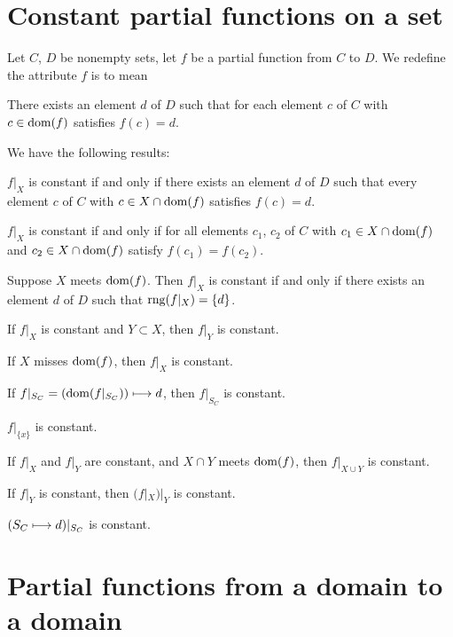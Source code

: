 \documentclass{article}
\begin{document}
\section{Constant partial functions on a set}

\begin{definition}
Let $C$, $D$ be nonempty sets, let $f$ be a partial function from $C$ to
$D$. We redefine the attribute $f$ is  to mean
\begin{defn}
\item There exists an element $d$ of $D$ such that for each element $c$
  of $C$ with $c\in\operatorname{dom}(f)$ satisfies $f(c)=d$.
\end{defn}
\end{definition}

We have the following results:
\begin{thm}
\item\label{partfun2:35} $f|_{X}$ is constant if and only if there
  exists an element $d$ of $D$ such that every element $c$ of $C$ with
  $c\in X\cap\operatorname{dom}(f)$ satisfies $f(c)=d$.
\item\label{partfun2:36} $f|_{X}$ is constant if and only if for all
  elements $c_{1}$, $c_{2}$ of $C$ with $c_{1}\in X\cap\operatorname{dom}(f)$
  and $c_{2}\in X\cap\operatorname{dom}(f)$ satisfy $f(c_{1})=f(c_{2})$.
\item\label{partfun2:37} Suppose $X$ meets $\operatorname{dom}(f)$. Then $f|_{X}$ is
  constant if and only if there exists an element $d$ of $D$ such that $\operatorname{rng}(f|_{X})=\{d\}$.
\item\label{partfun2:38} If $f|_{X}$ is constant and $Y\subset X$, then
  $f|_{Y}$ is constant.
\item\label{partfun2:39} If $X$ misses $\operatorname{dom}(f)$, then $f|_{X}$ is constant.
\item\label{partfun2:40} If $f|_{S_{C}}=(\operatorname{dom}(f|_{S_{C}}))\longmapsto d$,
  then $f|_{S_{C}}$ is constant.
\item\label{partfun2:41} $f|_{\{x\}}$ is constant.
\item\label{partfun2:42} If $f|_{X}$ and $f|_{Y}$ are constant, and
  $X\cap Y$ meets $\operatorname{dom}(f)$, then $f|_{X\cup Y}$ is constant.
\item\label{partfun2:43} If $f|_{Y}$ is constant, then $(f|_{X})|_{Y}$
  is constant.
\item\label{partfun2:44} $(S_{C}\longmapsto d)|_{S_{C}}$ is constant.
\end{thm}

\section{Partial functions from a domain to a domain}
\end{document}
